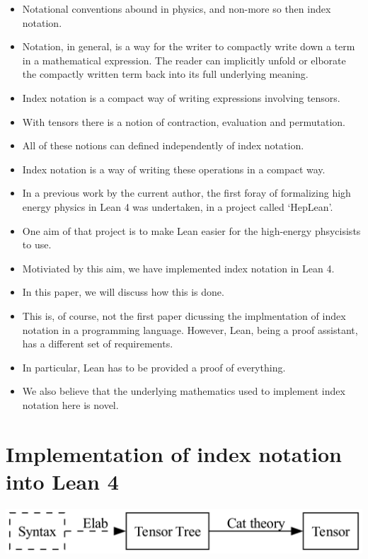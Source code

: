 \documentclass[a4paper, 11pt]{article}
\begin{document}
\begin{itemize}
\item Notational conventions abound in physics, and non-more so then index notation. 
\item Notation, in general, is a way for the writer to compactly write down a term in a 
  mathematical expression. The reader can implicitly unfold or elborate the compactly written term 
  back into its full underlying meaning. 
\item Index notation is a compact way of writing expressions involving tensors.
\item With tensors there is a notion of contraction, evaluation and permutation.
\item All of these notions can defined independently of index notation.
\item Index notation is a way of writing these operations in a compact way.
\item In a previous work by the current author, the first foray of formalizing high energy physics 
  in Lean 4 was undertaken, in a project called `HepLean'.
\item One aim of that project is to make Lean easier for the high-energy phsycisists to use. 
\item Motiviated by this aim, we have implemented index notation in Lean 4.
\item In this paper, we will discuss how this is done.
\item This is, of course, not the first paper dicussing the implmentation of index notation in a 
  programming language. However, Lean, being a proof assistant, has a different set of requirements. 
\item In particular, Lean has to be provided a proof of everything. 
\item We also believe that the underlying mathematics used to implement index notation here 
 is novel. 
\end{itemize}

\section{Implementation of index notation into Lean 4}
\includegraphics[width=\textwidth]{overviewFlow.png}
\end{document}
